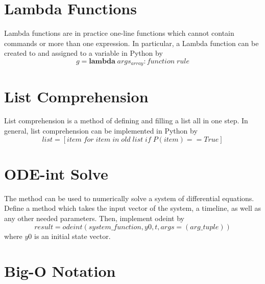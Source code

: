 \documentclass[12pt, a4paper, oneside, openright, titlepage]{book}
\begin{document}
\begin{appendices}
        \section{Lambda Functions}

        \begin{defn}
                Lambda functions are in practice one-line functions which cannot contain commands or more than one expression. In particular, a Lambda function can be created to and assigned to a variable in Python by \begin{equation}
                        g = \mathbf{lambda}\;args_{array}:function\;rule
                \end{equation}
        \end{defn}


        \section{List Comprehension}

        \begin{defn}
                List comprehension is a method of defining and filling a list all in one step. In general, list comprehension can be implemented in Python by \begin{equation}
                        list = [item\;for\;item\;in\;old\;list\;if\;P(item) == True]
                \end{equation}
        \end{defn}

        \section{ODE-int Solve}

        \begin{defn}
                The  method can be used to numerically solve a system of differential equations. Define a method which takes the input vector of the system, a timeline, as well as any other needed parameters. Then, implement odeint by \begin{equation}
                        result = odeint(system\_function, y0, t, args = (arg\_tuple))
                \end{equation}
                where $y0$ is an initial state vector.
        \end{defn}

        
        \section{Big-O Notation}


\end{appendices}
\end{document}
